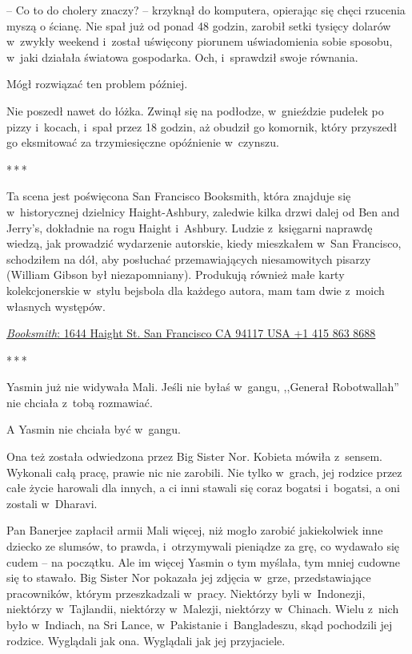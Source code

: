 \documentclass[oneside,polish,11pt,rmheadings]{mwbk}
\newcommand{\threeast}{\par\centerline{*\,*\,*}\medskip\par}
\begin{document}
-- Co to do cholery znaczy? -- krzyknął do komputera, opierając się chęci rzucenia myszą o ścianę. Nie spał już od ponad 48 godzin, zarobił setki tysięcy dolarów w~zwykły weekend i~został uświęcony piorunem uświadomienia sobie sposobu, w~jaki działała światowa gospodarka. Och, i~sprawdził swoje równania.

Mógł rozwiązać ten problem później.

Nie poszedł nawet do łóżka. Zwinął się na podłodze, w~gnieździe pudełek po pizzy i~kocach, i~spał przez 18 godzin, aż obudził go komornik, który przyszedł go eksmitować za trzymiesięczne opóźnienie w~czynszu.

\bigskip
\threeast

Ta scena jest poświęcona San Francisco Booksmith, która znajduje się w~historycznej dzielnicy Haight-Ashbury, zaledwie kilka drzwi dalej od Ben and Jerry's, dokładnie na rogu Haight i~Ashbury. Ludzie z~księgarni naprawdę wiedzą, jak prowadzić wydarzenie autorskie, kiedy mieszkałem w~San Francisco, schodziłem na dół, aby posłuchać przemawiających niesamowitych pisarzy (William Gibson był niezapomniany). Produkują również małe karty kolekcjonerskie w~stylu bejsbola dla każdego autora, mam tam dwie z~moich własnych występów.


\href{https://en.wikipedia.org/wiki/HTTP_404}{\textit{Booksmith}: 1644 Haight St. San Francisco CA 94117 USA +1 415 863 8688}

\bigskip
\threeast


Yasmin już nie widywała Mali. Jeśli nie byłaś w~gangu, ,,Generał Robotwallah'' nie chciała z~tobą rozmawiać.

A Yasmin nie chciała być w~gangu.

Ona też została odwiedzona przez Big Sister Nor. Kobieta mówiła z~sensem. Wykonali całą pracę, prawie nic nie zarobili. Nie tylko w~grach, jej rodzice przez całe życie harowali dla innych, a ci inni stawali się coraz bogatsi i~bogatsi, a oni zostali w~Dharavi.

Pan Banerjee zapłacił armii Mali więcej, niż mogło zarobić jakiekolwiek inne dziecko ze slumsów, to prawda, i~otrzymywali pieniądze za grę, co wydawało się cudem -- na początku. Ale im więcej Yasmin o tym myślała, tym mniej cudowne się to stawało. Big Sister Nor pokazała jej zdjęcia w~grze, przedstawiające pracowników, którym przeszkadzali w~pracy. Niektórzy byli w~Indonezji, niektórzy w~Tajlandii, niektórzy w~Malezji, niektórzy w~Chinach. Wielu z~nich było w~Indiach, na Sri Lance, w~Pakistanie i~Bangladeszu, skąd pochodzili jej rodzice. Wyglądali jak ona. Wyglądali jak jej przyjaciele.
\end{document}

